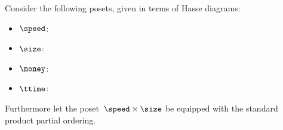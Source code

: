 \begin{gradedexercise}
    \label{ex:ComposingDesignProblems}

    Consider the following posets, given in terms of Hasse diagrams:
    \begin{itemize}
        \item $\speed$:
              \begin{center}
              \end{center}
        \item $\size$:
              \begin{center}
              \end{center}
        \item $\money$:

              \begin{center}
              \end{center}

        \item $\ttime$:

              \begin{center}
              \end{center}
    \end{itemize}
    Furthermore let the poset~$\speed \times \size$ be equipped with the standard product partial ordering.


\end{gradedexercise}
